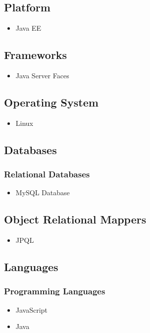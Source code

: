 \subsection{Platform}
\begin{itemize}
		\item Java EE
\end{itemize}


\subsection{Frameworks}
\begin{itemize}
		\item Java Server Faces
\end{itemize}

\subsection{Operating System}
\begin{itemize}
		\item Linux
\end{itemize}
	
	
\subsection{Databases}
\subsubsection{Relational Databases}
\begin{itemize}
	\item MySQL Database
\end{itemize}
	

\subsection{Object Relational Mappers}
\begin{itemize}
	\item JPQL
\end{itemize}

\subsection{Languages}
\subsubsection{Programming Languages}
\begin{itemize}
	\item JavaScript	
	\item Java
\end{itemize}

